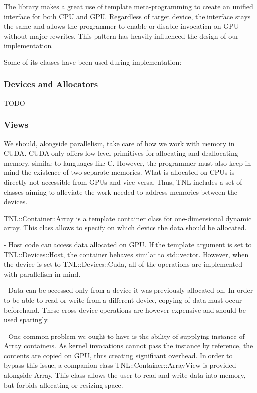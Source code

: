 \documentclass{article}
\begin{document}
The library makes a great use of template meta-programming to create an unified interface for both CPU and GPU. Regardless of target device, the interface stays the same and allows the programmer to enable or disable invocation on GPU without major rewrites. This pattern has heavily influenced the design of our implementation.

Some of its classes have been used during implementation:

\subsubsection{Devices and Allocators}

TODO

\subsubsection{Views}

We should, alongside parallelism, take care of how we work with memory in CUDA. CUDA only offers low-level primitives for allocating and deallocating memory, similar to languages like C. However, the programmer must also keep in mind the existence of two separate memories. What is allocated on CPUs is directly not accessible from GPUs and vice-versa. Thus, TNL includes a set of classes aiming to alleviate the work needed to address memories between the devices.

TNL::Container::Array is a template container class for one-dimensional dynamic array. This class allows to specify on which device the data should be allocated.

- Host code can access data allocated on GPU. If the template argument is set to TNL::Devices::Host, the container behaves similar to std::vector. However, when the device is set to TNL::Devices::Cuda, all of the operations are implemented with parallelism in mind.

- Data can be accessed only from a device it was previously allocated on. In order to be able to read or write from a different device, copying of data must occur beforehand. These cross-device operations are however expensive and should be used sparingly.

- One common problem we ought to have is the ability of supplying instance of Array containers. As kernel invocations cannot pass the instance by reference, the contents are copied on GPU, thus creating significant overhead. In order to bypass this issue, a companion class TNL::Container::ArrayView is provided alongside Array. This class allows the user to read and write data into memory, but forbids allocating or resizing space.
\end{document}
